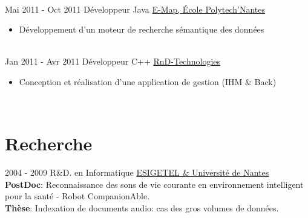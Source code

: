 \documentclass[letterpaper]{twentysecondcv} %
\begin{document}
\begin{twenty}
	   \\
	    \twentyitem
	    {Mai 2011 -}
	    {Oct 2011}
	    {Développeur Java}
	    {\href{}{E-Map, École Polytech'Nantes}}
	    {}
	    {
	    \begin{itemize}
	    \item Développement d'un moteur de recherche sémantique des données
	    \end{itemize}
	    }

	   \\
	    \twentyitem
	    {Jan 2011 -}
	    {Avr 2011}
	    {Développeur C++}
	    {\href{}{RnD-Technologies}}
	    {}
	    {
	    \begin{itemize}
		\item Conception et réalisation d'une application de gestion (IHM \& Back)
	    \end{itemize}
	    }

	   \\
\end{twenty}

\section{Recherche}
\begin{twenty}
	\twentyitem
    	{2004 - 2009}
		{}
        {R\&D. en Informatique}
        {\href{https://www.univ-nantes.fr/}{ESIGETEL \& Université de Nantes}}
        {}
	       {
	        \textbf{PostDoc}: Reconnaissance des sons de vie courante en environnement intelligent pour la santé - Robot CompanionAble. \\
	       	\textbf{Thèse}: Indexation de documents audio: cas des gros volumes de données.
	        {
			}
	       }
  
\end{twenty}
\end{document}
